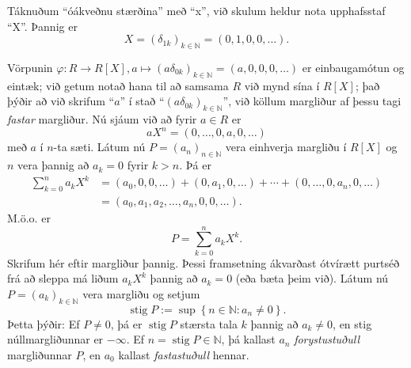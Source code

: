 \documentclass[a4paper,icelandic,11pt]{book}
\theoremstyle{plain}
\newcommand{\N}{\mathbb{N}}
\DeclareMathOperator{\stig}{stig} %
\begin{document}

Táknuðum "`óákveðnu stærðina"' með "`x"', við skulum heldur nota upphafsstaf
"`X"'. Þannig er 
\[
X = (\delta_{1k})_{k\in\N} = (0,1,0,0,\dots).
\]

Vörpunin $\varphi:R\to R[X], a\mapsto (a\delta_{0k})_{k\in\N} = (a,0,0,0,\dots)
$ er einbaugamótun og eintæk; við getum notað hana til að samsama $R$ við mynd
sína í $R[X]$; það þýðir að við skrifum "`$a$"' í stað
"`$(a\delta_{0k})_{k\in\N}$"', við köllum margliður af þessu tagi
\emph{fastar} margliður. Nú sjáum við að fyrir $a\in R$
er 
\[
aX^n = (0,\dots,0,a,0,\dots)
\]
með $a$ í $n$-ta sæti. Látum nú $P=(a_n)_{n\in\N}$ vera einhverja margliðu í
$R[X]$ og $n$ vera þannig að $a_k = 0$ fyrir $k>n$. Þá er
\begin{align*}
  \sum_{k=0}^{n}a_kX^k 
  &= (a_0,0,0,\dots) + (0,a_1,0,\dots) + \cdots +
     (0,\dots,0,a_n,0,\dots)
  \\
  &= (a_0,a_1,a_2,\dots,a_n,0,0,\dots).
\end{align*}
M.ö.o. er\[
P = \sum_{k=0}^{n}a_k X^k.
\]
Skrifum hér eftir margliður þannig. Þessi framsetning ákvarðast ótvírætt purtséð
frá að sleppa má liðum $a_k X^k$ þannig að $a_k = 0$ (eða bæta þeim við). Látum
nú $P = (a_k)_{k\in\N}$ vera margliðu og setjum 
\[
\stig P := \sup \left\{ n\in\N:a_n\neq 0 \right\}.
\]
Þetta þýðir: Ef $P\neq 0$, þá er $\stig P$ stærsta tala $k$ þannig að $a_k\neq
0$, en stig núllmargliðunnar er $-\infty$. Ef $n = \stig P\in\N$, þá kallast
$a_n$ \emph{forystustuðull}
margliðunnar $P$, en $a_0$ kallast
\emph{fastastuðull} hennar. 
\end{document}
